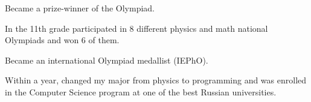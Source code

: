 
{Became a prize-winner of the Olympiad.}

\divider

{In the 11th grade participated in 8 different physics and math national Olympiads and won 6 of them. 

Became an international Olympiad medallist (IEPhO).}

\divider

{Within a year, changed my major from physics to programming and was enrolled in the Computer Science program at one of the best Russian universities.}
